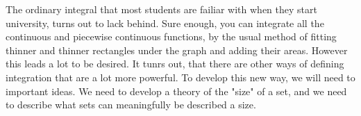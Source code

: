 \documentclass[../../main.tex]{subfiles}
\begin{document}
The ordinary integral that most students are failiar with when they start university, turns out to lack behind. Sure enough, you can integrate all the continuous and piecewise continuous functions, by the usual method of fitting thinner and thinner rectangles under the graph and adding their areas. However this leads a lot to be desired. It tunrs out, that there are other ways of defining integration that are a lot more powerful. To develop this new way, we will need to important ideas. We need to develop a theory of the "size" of a set, and we need to describe what sets can meaningfully be described a size.
\end{document}

